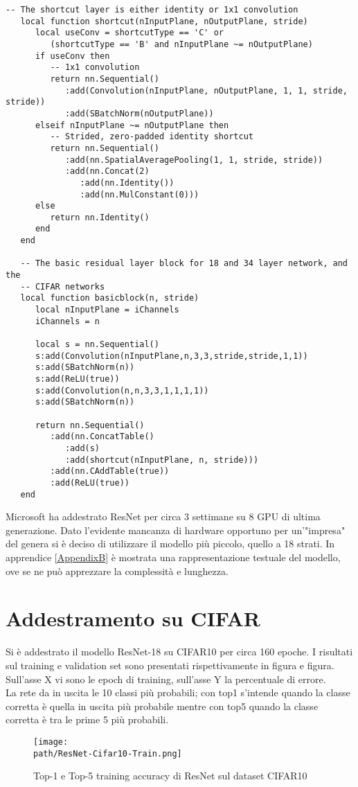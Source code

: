 \begin{lstlisting}[language={[5.2]Lua}]
-- The shortcut layer is either identity or 1x1 convolution
   local function shortcut(nInputPlane, nOutputPlane, stride)
      local useConv = shortcutType == 'C' or
         (shortcutType == 'B' and nInputPlane ~= nOutputPlane)
      if useConv then
         -- 1x1 convolution
         return nn.Sequential()
            :add(Convolution(nInputPlane, nOutputPlane, 1, 1, stride, stride))
            :add(SBatchNorm(nOutputPlane))
      elseif nInputPlane ~= nOutputPlane then
         -- Strided, zero-padded identity shortcut
         return nn.Sequential()
            :add(nn.SpatialAveragePooling(1, 1, stride, stride))
            :add(nn.Concat(2)
               :add(nn.Identity())
               :add(nn.MulConstant(0)))
      else
         return nn.Identity()
      end
   end

   -- The basic residual layer block for 18 and 34 layer network, and the
   -- CIFAR networks
   local function basicblock(n, stride)
      local nInputPlane = iChannels
      iChannels = n

      local s = nn.Sequential()
      s:add(Convolution(nInputPlane,n,3,3,stride,stride,1,1))
      s:add(SBatchNorm(n))
      s:add(ReLU(true))
      s:add(Convolution(n,n,3,3,1,1,1,1))
      s:add(SBatchNorm(n))

      return nn.Sequential()
         :add(nn.ConcatTable()
            :add(s)
            :add(shortcut(nInputPlane, n, stride)))
         :add(nn.CAddTable(true))
         :add(ReLU(true))
   end
\end{lstlisting}
 
Microsoft ha addestrato ResNet per circa 3 settimane su 8 GPU di ultima generazione. Dato l'evidente mancanza di hardware opportuno per un'"impresa" del genera si è deciso di utilizzare il modello più piccolo, quello a 18 strati. In apprendice \ref{AppendixB} è mostrata una rappresentazione testuale del modello, ove se ne può apprezzare la complessità e lunghezza. 


\section{Addestramento su CIFAR}
Si è addestrato il modello ResNet-18 su CIFAR10 per circa 160 epoche. I risultati sul training e validation set sono presentati rispettivamente in figura e figura. Sull'asse X vi sono le epoch di training, sull'asse Y la percentuale di errore. 
\\
La rete da in uscita le 10 classi più probabili; con top1 s'intende quando la classe corretta è quella in uscita più probabile mentre con top5 quando la classe corretta è tra le prime 5 più probabili. \\
\begin{figure}[h!]
 \centering
 \texttt{[image: \\path/ResNet-Cifar10-Train.png]} 
 \caption{Top-1 e Top-5 training accuracy di ResNet sul dataset CIFAR10}
 \label{fig:res-train}
\end{figure}

